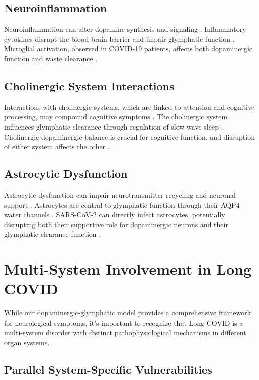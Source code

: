 \documentclass[12pt]{article}
\begin{document}
\subsection*{Neuroinflammation}

Neuroinflammation can alter dopamine synthesis and signaling \citep{crunfli2023astrocytes}. Inflammatory cytokines disrupt the blood-brain barrier and impair glymphatic function \citep{Banks2015}. Microglial activation, observed in COVID-19 patients, affects both dopaminergic function and waste clearance \citep{yang2021choroidplexus}.

\subsection*{Cholinergic System Interactions}

Interactions with cholinergic systems, which are linked to attention and cognitive processing, may compound cognitive symptoms \citep{leitzke2025cholinergic}. The cholinergic system influences glymphatic clearance through regulation of slow-wave sleep \citep{Hablitz2019}. Cholinergic-dopaminergic balance is crucial for cognitive function, and disruption of either system affects the other \citep{Grizzell2014}.

\subsection*{Astrocytic Dysfunction}

Astrocytic dysfunction can impair neurotransmitter recycling and neuronal support \citep{crunfli2023astrocytes}. Astrocytes are central to glymphatic function through their AQP4 water channels \citep{Mestre2018}. SARS-CoV-2 can directly infect astrocytes, potentially disrupting both their supportive role for dopaminergic neurons and their glymphatic clearance function \citep{crunfli2023astrocytes}.

\section{Multi-System Involvement in Long COVID}

While our dopaminergic-glymphatic model provides a comprehensive framework for neurological symptoms, it's important to recognize that Long COVID is a multi-system disorder with distinct pathophysiological mechanisms in different organ systems.

\subsection*{Parallel System-Specific Vulnerabilities}
\end{document}
